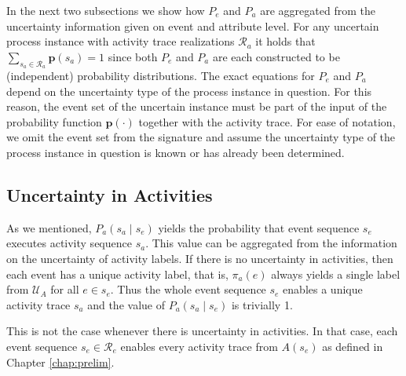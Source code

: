 In the next two subsections we show how $P_e$ and $P_a$ are aggregated from the uncertainty information given on event and attribute level.
For any uncertain process instance with activity trace realizations $\mathcal{R}_a$ it holds that $\sum_{s_a \in \mathcal{R}_a} \textbf{p}(s_a) = 1$ since both $P_e$ and $P_a$ are each constructed to be (independent) probability distributions.
The exact equations for $P_e$ and $P_a$ depend on the uncertainty type of the process instance in question.
For this reason, the event set of the uncertain instance must be part of the input of the probability function $\textbf{p}(\cdot)$ together with the activity trace.
For ease of notation, we omit the event set from the signature and assume the uncertainty type of the process instance in question is known or has already been determined.


\subsection{Uncertainty in Activities}
As we mentioned, $P_a(s_a \mid s_e)$ yields the probability that event sequence $s_e$ executes activity sequence $s_a$.
This value can be aggregated from the information on the uncertainty of activity labels.
If there is no uncertainty in activities, then each event has a unique activity label, that is, $\pi_a(e)$ always yields a single label from $\mathcal{U}_A$ for all $e \in s_e$.
Thus the whole event sequence $s_e$ enables a unique activity trace $s_a$ and the value of $P_a(s_a \mid s_e)$ is trivially 1.

This is not the case whenever there is uncertainty in activities.
In that case, each event sequence $s_e \in \mathcal{R}_e$ enables every activity trace from $A(s_e)$ as defined in Chapter \ref{chap:prelim}.

